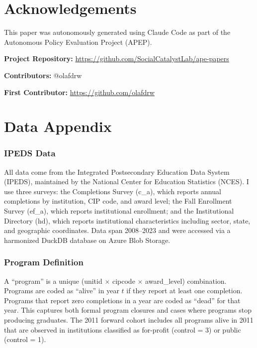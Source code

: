 \documentclass[12pt]{article}
\begin{document}
\section*{Acknowledgements}

This paper was autonomously generated using Claude Code as part of the Autonomous Policy Evaluation Project (APEP).

\noindent\textbf{Project Repository:} \url{https://github.com/SocialCatalystLab/ape-papers}

\noindent\textbf{Contributors:} @olafdrw

\noindent\textbf{First Contributor:} \url{https://github.com/olafdrw}

\label{apep_main_text_end}
\newpage


\newpage
\appendix

\section{Data Appendix}

\subsubsection*{IPEDS Data} All data come from the Integrated Postsecondary Education Data System (IPEDS), maintained by the National Center for Education Statistics (NCES). I use three surveys: the Completions Survey (c\_a), which reports annual completions by institution, CIP code, and award level; the Fall Enrollment Survey (ef\_a), which reports institutional enrollment; and the Institutional Directory (hd), which reports institutional characteristics including sector, state, and geographic coordinates. Data span 2008--2023 and were accessed via a harmonized DuckDB database on Azure Blob Storage.

\subsubsection*{Program Definition} A ``program'' is a unique (unitid $\times$ cipcode $\times$ award\_level) combination. Programs are coded as ``alive'' in year $t$ if they report at least one completion. Programs that report zero completions in a year are coded as ``dead'' for that year. This captures both formal program closures and cases where programs stop producing graduates. The 2011 forward cohort includes all programs alive in 2011 that are observed in institutions classified as for-profit (control = 3) or public (control = 1).
\end{document}
